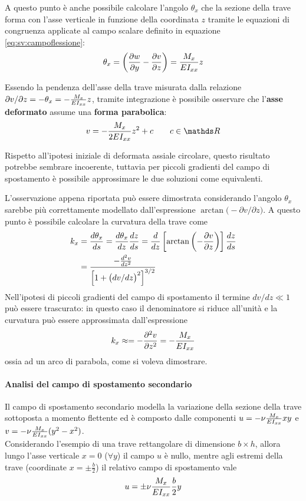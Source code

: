 		\vspace{3mm}
		A questo punto è anche possibile calcolare l'angolo $\theta_x$ che la sezione della trave forma con l'asse verticale in funzione della coordinata $z$ tramite le equazioni di congruenza applicate al campo scalare definito in equazione \ref{eq:sv:campoflessione}:
		\[ \theta_x = \left( \frac{\partial w}{\partial y} - \frac{\partial v}{\partial z} \right) = \frac {M_x}{EI_{xx}} z \]
		\begin{concetto}
		    Essendo  la pendenza dell'asse della trave misurata dalla relazione $\partial v / \partial z = -\theta_x = - \frac{M_x}{EI_{xx}} z$, tramite integrazione è possibile osservare che l'\textbf{asse deformato} assume una \textbf{forma parabolica}:
    		\[ v = - \frac{\Mx}{2E\Ixx} z^2 + c \qquad c \in \mathds R \]
		\end{concetto}
		\begin{osservazione}
		    Rispetto all'ipotesi iniziale di deformata assiale circolare, questo risultato potrebbe sembrare incoerente, tuttavia per piccoli gradienti del campo di spostamento è possibile approssimare le due soluzioni come equivalenti.
		\end{osservazione}
		\begin{dimostrazione}
		    L'osservazione appena riportata può essere dimostrata considerando l'angolo $\theta_x$ sarebbe più correttamente modellato dall'espressione $ \arctan \big( - \partial v / \partial z\big)$. A questo punto è possibile calcolare la curvatura della trave come
		    \begin{align*}
		        k_x &=\frac{d\theta_x}{ds} = \frac{d\theta_x}{dz} \frac{dz}{ds} = \frac d {dz} \left[ \arctan \left( - \frac{\partial v}{\partial z} \right)\right] \frac{dz}{ds} \\
		        &= \frac{- \frac{d^2v}{dz^2}}{\Big[ 1 + 
		         \big(dv/dz\big)^2 \Big]^{3/2}}
		    \end{align*}
		    Nell'ipotesi di piccoli gradienti del campo di spostamento il termine $dv/dz \ll 1$ può essere trascurato: in questo caso il denominatore si riduce all'unità e la curvatura può essere approssimata dall'espressione 
		    \[ k_x \approx = - \frac{\partial ^2v}{\partial z^2} = -\frac{M_x}{EI_{xx}} \]
		    ossia ad un arco di parabola, come si voleva dimostrare.
		\end{dimostrazione}
		
		\paragraph{Analisi del campo di spostamento secondario} Il campo di spostamento secondario modella la variazione della sezione della trave sottoposta a momento flettente ed è composto dalle componenti $u = - \nu \frac {M_x} {EI_{xx}}xy$ e $v = - \nu \frac{M_x}{EI_{xx}} (y^2-x^2)$. \\
		Considerando l'esempio di una trave rettangolare di dimensione $b\times h$, allora lungo l'asse verticale $x=0$ ($\forall y$) il campo $u$ è nullo, mentre agli estremi della trave (coordinate $x=\pm \frac b2$) il relativo campo di spostamento vale
		\[ u = \pm \nu \frac{M_x}{EI_{xx}} \frac b 2 y   \]
		
